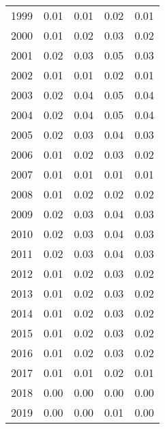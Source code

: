 \documentclass[11pt]{book}
\begin{document}
\begin{longtable}[]{@{}lrrrr@{}}
1999 & 0.01 & 0.01 & 0.02 & 0.01\tabularnewline
2000 & 0.01 & 0.02 & 0.03 & 0.02\tabularnewline
2001 & 0.02 & 0.03 & 0.05 & 0.03\tabularnewline
2002 & 0.01 & 0.01 & 0.02 & 0.01\tabularnewline
2003 & 0.02 & 0.04 & 0.05 & 0.04\tabularnewline
2004 & 0.02 & 0.04 & 0.05 & 0.04\tabularnewline
2005 & 0.02 & 0.03 & 0.04 & 0.03\tabularnewline
2006 & 0.01 & 0.02 & 0.03 & 0.02\tabularnewline
2007 & 0.01 & 0.01 & 0.01 & 0.01\tabularnewline
2008 & 0.01 & 0.02 & 0.02 & 0.02\tabularnewline
2009 & 0.02 & 0.03 & 0.04 & 0.03\tabularnewline
2010 & 0.02 & 0.03 & 0.04 & 0.03\tabularnewline
2011 & 0.02 & 0.03 & 0.04 & 0.03\tabularnewline
2012 & 0.01 & 0.02 & 0.03 & 0.02\tabularnewline
2013 & 0.01 & 0.02 & 0.03 & 0.02\tabularnewline
2014 & 0.01 & 0.02 & 0.03 & 0.02\tabularnewline
2015 & 0.01 & 0.02 & 0.03 & 0.02\tabularnewline
2016 & 0.01 & 0.02 & 0.03 & 0.02\tabularnewline
2017 & 0.01 & 0.01 & 0.02 & 0.01\tabularnewline
2018 & 0.00 & 0.00 & 0.00 & 0.00\tabularnewline
2019 & 0.00 & 0.00 & 0.01 & 0.00\tabularnewline
\bottomrule
\end{longtable}
\clearpage
\end{document}
